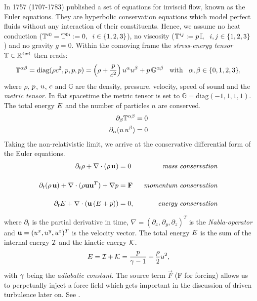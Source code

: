In 1757  (1707-1783) published a set of equations for
inviscid flow, known as the Euler equations. They are hyperbolic
conservation equations which model perfect fluids without any interaction of their
constituents.  Hence, we assume no
heat conduction ($\mathbb{T}^{i0} = \mathbb{T}^{0i} := 0, \;\;i \in \{1,2,3\}$), no viscosity
($\mathbb{T}^{ij} := p\,\mathbb{I}, \;\;i,j \in \{1,2,3\}$) and no gravity $g = 0$. 
Within the comoving frame the
\emph{stress-energy tensor} $\mathbb{T} \in \mathbb{R}^{4x4}$ then reads:
\begin{equation}
\mathbb{T}^{\alpha\beta} = \text{diag}(\rho c^2,p,p,p) = \left(\rho + \frac{p}{c^2}\right) u^\alpha u^\beta + p\,\mathbb{G}^{\alpha\beta} \;\;\; \text{with}  \;\;\; \alpha, \beta \in \{0,1,2,3\},
\end{equation}
where $\rho$, $p$, $u$, $c$ and $\mathbb{G}$ are the
density, pressure, velocity, speed of sound and the \emph{metric tensor}.
In flat spacetime the metric tensor is set to $\mathbb{G} =
\text{diag}(-1,1,1,1)$. The total energy $E$ and the number of particles $n$ are
conserved.
\begin{align}
\partial_\beta \mathbb{T}^{\alpha\beta}  &= 0\\
\partial_\alpha (n\,u^\beta) &= 0
\end{align}
Taking the non-relativistic limit, we arrive at the conservative differential
form of the Euler equations.
\begin{align}
\label{eqn:comp-euler-conservative}
\partial_t\rho + \nabla \cdot (\rho\,\mathbf{u})   &=  0 \;\; &\text{\emph{mass conservation}}\\[0.4cm]
\partial_t(\rho\,\mathbf{u}) + \nabla\cdot(\rho\mathbf{u}\mathbf{u}^T) + \nabla p &= \mathbf{F}  \;\;&\text{\emph{momentum conservation}}\\[0.4cm]
\partial_t E + \nabla \cdot (\mathbf{u}\,(E + p)) &=  0,\;\;&\text{\emph{energy conservation}}
\end{align}

where $\partial_t$ is the partial derivative in time, $\nabla =
(\partial_x,\partial_y,\partial_z)^T$ is the \emph{Nabla-operator} and
$\mathbf{u} = (u^x,u^y,u^z)^T$ is the velocity vector. The total energy $E$ is
the sum of the internal energy $\mathcal{I}$ and the kinetic energy $\mathcal{K}$.
\begin{equation}
E = \mathcal{I} + \mathcal{K} = \frac{p}{\gamma -1} + \frac{\rho}{2}u^2,
\end{equation}
with $\gamma$ being the \emph{adiabatic constant}.
The source term $\vec{F}$ (F for forcing) allows us to perpetually inject a
force field which gets important in the discussion of driven turbulence later
on. See .

